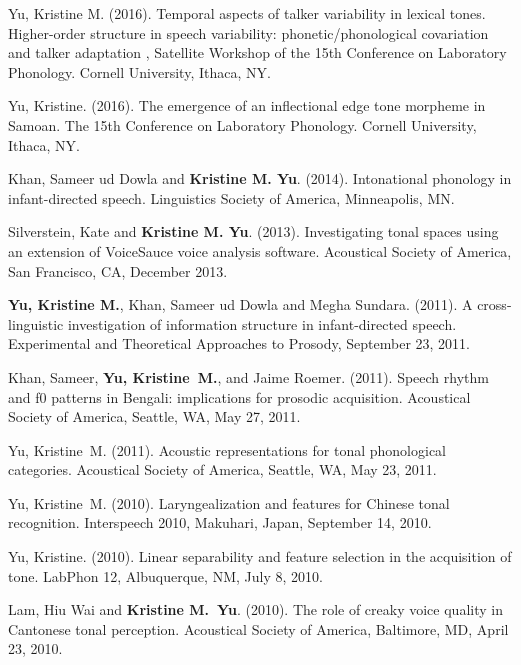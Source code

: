 \documentclass[10pt]{article}
\begin{document}
\begin{bibenum}

\item Yu, Kristine M. (2016). Temporal aspects of talker variability in lexical tones. Higher-order structure in speech variability: phonetic/phonological covariation and talker adaptation
, Satellite Workshop of the 15th Conference on Laboratory
  Phonology. Cornell University, Ithaca, NY.

\item Yu, Kristine. (2016). The emergence of an inflectional edge tone
  morpheme in Samoan. The 15th Conference on Laboratory
  Phonology. Cornell University, Ithaca, NY.

\item Khan, Sameer ud Dowla and \textbf{Kristine M. Yu}. (2014). Intonational phonology
  in infant-directed speech. Linguistics Society of America, Minneapolis, MN.

\item Silverstein, Kate and \textbf{Kristine M. Yu}. (2013). Investigating
  tonal spaces using an extension of VoiceSauce voice analysis
  software. Acoustical Society of America, San Francisco, CA, December 2013.

\item \textbf{Yu, Kristine M.}, Khan, Sameer ud Dowla and Megha Sundara. (2011). A cross-linguistic
investigation of information structure in infant-directed
speech. Experimental and Theoretical Approaches to Prosody, September 23, 2011.

\item Khan, Sameer, \textbf{Yu, Kristine~M.}, and Jaime Roemer. (2011). Speech rhythm and f0 patterns
in Bengali: implications for prosodic acquisition. Acoustical
Society of America, Seattle, WA, May 27, 2011.

\item Yu, Kristine~M. (2011). Acoustic representations for tonal phonological
categories. Acoustical Society of America, Seattle, WA, May
23, 2011.

\item Yu, Kristine~M. (2010). Laryngealization and features for Chinese tonal
recognition. Interspeech 2010, Makuhari, Japan, September 14, 2010.

\item Yu, Kristine. (2010). Linear separability and feature selection in the
acquisition of tone. LabPhon 12, Albuquerque, NM, July 8, 2010.

\item Lam, Hiu Wai and \textbf{Kristine M.~Yu}. (2010). The role of creaky voice quality in {C}antonese
tonal perception. Acoustical Society of America, Baltimore,
MD, April 23, 2010.


\end{bibenum}
\end{document}
